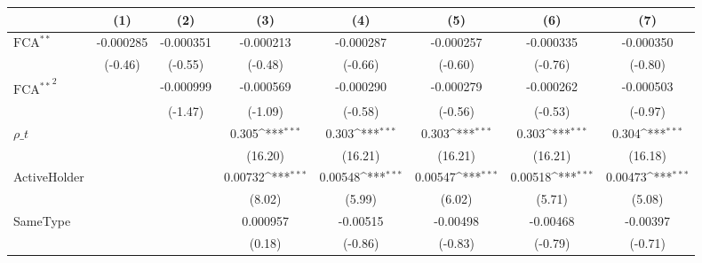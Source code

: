 {
\def\sym#1{\ifmmode^{#1}\else\(^{#1}\)\fi}
\begin{tabular}{l*{7}{c}}
\hline\hline
                    &\multicolumn{1}{c}{(1)}         &\multicolumn{1}{c}{(2)}         &\multicolumn{1}{c}{(3)}         &\multicolumn{1}{c}{(4)}         &\multicolumn{1}{c}{(5)}         &\multicolumn{1}{c}{(6)}         &\multicolumn{1}{c}{(7)}         \\
\hline
$ \text{FCA}^{**} $ &   -0.000285         &   -0.000351         &   -0.000213         &   -0.000287         &   -0.000257         &   -0.000335         &   -0.000350         \\
                    &     (-0.46)         &     (-0.55)         &     (-0.48)         &     (-0.66)         &     (-0.60)         &     (-0.76)         &     (-0.80)         \\
[1em]
 $ { \text{FCA} ^{**} } ^2 $&                     &   -0.000999         &   -0.000569         &   -0.000290         &   -0.000279         &   -0.000262         &   -0.000503         \\
                    &                     &     (-1.47)         &     (-1.09)         &     (-0.58)         &     (-0.56)         &     (-0.53)         &     (-0.97)         \\
[1em]
$ \rho\_t $          &                     &                     &       0.305\sym{***}&       0.303\sym{***}&       0.303\sym{***}&       0.303\sym{***}&       0.304\sym{***}\\
                    &                     &                     &     (16.20)         &     (16.21)         &     (16.21)         &     (16.21)         &     (16.18)         \\
[1em]
ActiveHolder        &                     &                     &     0.00732\sym{***}&     0.00548\sym{***}&     0.00547\sym{***}&     0.00518\sym{***}&     0.00473\sym{***}\\
                    &                     &                     &      (8.02)         &      (5.99)         &      (6.02)         &      (5.71)         &      (5.08)         \\
[1em]
SameType            &                     &                     &    0.000957         &    -0.00515         &    -0.00498         &    -0.00468         &    -0.00397         \\
                    &                     &                     &      (0.18)         &     (-0.86)         &     (-0.83)         &     (-0.79)         &     (-0.71)         \\

\end{tabular}}
